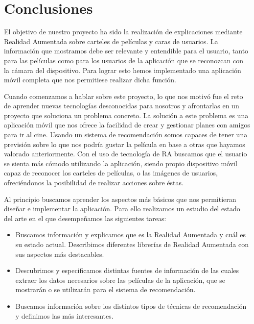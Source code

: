 
\cleardoublepage


\chapter{Conclusiones}
\label{makereference5}

El objetivo de nuestro proyecto ha sido la realización de explicaciones mediante Realidad Aumentada sobre 
carteles de películas y caras de usuarios. La información que mostramos debe ser relevante y entendible para el 
usuario, tanto para las películas como para los usuarios de la aplicación que se reconozcan con la cámara del dispositivo. 
Para lograr esto hemos implementado una aplicación móvil completa que nos permitiese realizar dicha función.

Cuando comenzamos a hablar sobre este proyecto, lo que nos motivó fue el
 reto de aprender nuevas tecnologías desconocidas para nosotros y afrontarlas
 en un proyecto que soluciona un problema concreto. La solución a este problema
 es una aplicación móvil que nos ofrece la facilidad de crear y gestionar
 planes con amigos para ir al cine. Usando un sistema de recomendación somos
 capaces de tener una previsión sobre lo que nos podría gustar la película en
 base a otras que hayamos valorado anteriormente.
 Con el uso de tecnología de RA buscamos que el usuario se sienta más cómodo
 utilizando la aplicación, siendo 
 propio dispositivo móvil capaz de reconocer los carteles de películas, o las
 imágenes de usuarios, ofreciéndonos la posibilidad de realizar acciones sobre éstas.

Al principio buscamos aprender los aspectos más básicos que nos permitieran
 diseñar e implementar la aplicación. Para ello realizamos un estudio
 del estado del arte en el que desempeñamos las siguientes tareas:
\begin{itemize}  
    \item Buscamos información y explicamos que es la Realidad Aumentada y cuál
     es su estado actual. Describimos diferentes librerías de Realidad Aumentada
     con sus aspectos más destacables.
    \item Descubrimos y especificamos distintas fuentes de información de las
     cuales extraer los datos necesarios sobre las películas de la aplicación,
     que se mostrarán o se utilizarán para el sistema de recomendación.
    \item Buscamos información sobre los distintos tipos de técnicas de
     recomendación y definimos las más interesantes.
\end{itemize}

